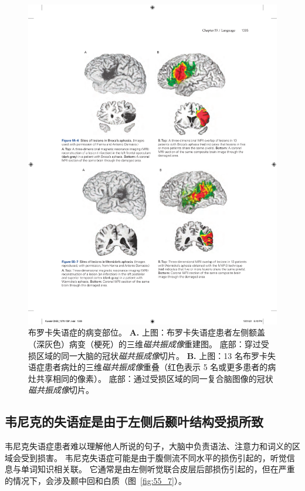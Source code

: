 \begin{figure}[htbp]
	\centering
	\includegraphics[width=0.8\linewidth]{chap55/fig_55_6}
	\caption{布罗卡失语症的病变部位。
		\textbf{A.} 上图：布罗卡失语症患者左侧额盖（深灰色）病变（梗死）的三维\textit{磁共振成像}重建图。
		底部：穿过受损区域的同一大脑的冠状\textit{磁共振成像}切片。
		\textbf{B.} 上图：13 名布罗卡失语症患者病灶的三维\textit{磁共振成像}重叠（红色表示 5 名或更多患者的病灶共享相同的像素）。
		底部：通过受损区域的同一复合脑图像的冠状\textit{磁共振成像}切片。}
	\label{fig:55_6}
\end{figure}



\subsection{韦尼克的失语症是由于左侧后颞叶结构受损所致}

韦尼克失语症患者难以理解他人所说的句子，大脑中负责语法、注意力和词义的区域会受到损害。
韦尼克失语症可能是由于腹侧流不同水平的损伤引起的，听觉信息与单词知识相关联。
它通常是由左侧听觉联合皮层后部损伤引起的，但在严重的情况下，会涉及颞中回和白质（图~\ref{fig:55_7}）。


